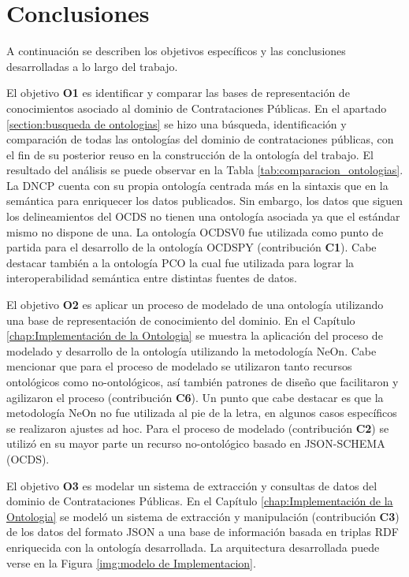 \section{Conclusiones}
\label{chap:analisis}
A continuación se describen los objetivos específicos y las conclusiones desarrolladas a lo largo del trabajo.  

El objetivo \textbf{O1} es identificar y comparar las bases de representación de conocimientos asociado al dominio de Contrataciones Públicas. En el apartado \ref{section:busqueda de ontologias} se hizo una búsqueda, identificación y comparación de todas las ontologías del dominio de contrataciones públicas, con el fin de su posterior reuso en la construcción de la ontología del trabajo. El resultado del análisis se puede observar en la Tabla \ref{tab:comparacion_ontologias}. La DNCP cuenta con su propia ontología centrada más en la sintaxis que en la semántica para enriquecer los datos publicados. Sin embargo, los datos que siguen los delineamientos del OCDS no tienen una ontología asociada ya que el estándar mismo no dispone de una. La ontología OCDSV0 fue utilizada como punto de partida para el desarrollo de la ontología OCDSPY (contribución \textbf{C1}). Cabe destacar también a la ontología PCO la cual fue utilizada para lograr la interoperabilidad semántica entre distintas fuentes de datos.

El objetivo \textbf{O2} es aplicar un proceso de modelado de una ontología utilizando una base de representación de conocimiento del dominio. En el Capítulo \ref{chap:Implementación de la Ontologia} se muestra la aplicación del proceso de modelado y desarrollo de la ontología utilizando la metodología NeOn. Cabe mencionar que para el proceso de modelado se utilizaron tanto recursos ontológicos como no-ontológicos, así también patrones de diseño que facilitaron y agilizaron el proceso (contribución \textbf{C6}). Un punto que cabe destacar es que la metodología NeOn no fue utilizada al pie de la letra, en algunos casos específicos se realizaron ajustes ad hoc. Para el proceso de modelado (contribución \textbf{C2}) se utilizó en su mayor parte un recurso no-ontológico basado en JSON-SCHEMA (OCDS).

El objetivo \textbf{O3} es modelar un sistema de extracción y consultas de datos del dominio de Contrataciones Públicas. En el Capítulo \ref{chap:Implementación de la Ontologia} se modeló un sistema de extracción y manipulación (contribución \textbf{C3}) de los datos del formato JSON a una base de información basada en triplas RDF enriquecida con la ontología desarrollada. La arquitectura desarrollada puede verse en la Figura \ref{img:modelo de Implementacion}.

